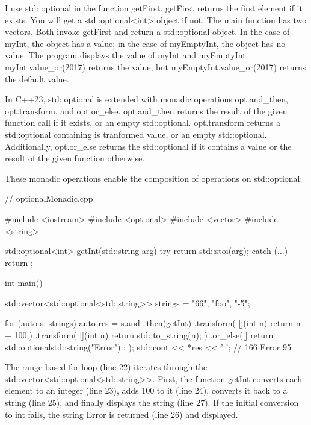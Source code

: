 I use std::optional in the function getFirst. getFirst returns the first element if it exists. You will get a std::optional<int> object if not. The main function has two vectors. Both invoke getFirst and return a std::optional object. In the case of myInt, the object has a value; in the case of myEmptyInt, the object has no value. The program displays the value of myInt and myEmptyInt. myInt.value\_or(2017) returns the value, but myEmptyInt.value\_or(2017) returns the default value.

In C++23, std::optional is extended with monadic operations opt.and\_then, opt.transform, and opt.or\_else. opt.and\_then returns the result of the given function call if it exists, or an empty std::optional. opt.transform returns a std::optional containing is tranformed value, or an empty std::optional. Additionally, opt.or\_else returns the std::optional if it contains a value or the result of the given function otherwise.

These monadic operations enable the composition of operations on std::optional:


\begin{cpp}
// optionalMonadic.cpp

#include <iostream>
#include <optional>
#include <vector>
#include <string>

std::optional<int> getInt(std::string arg) {
	try {
		return {std::stoi(arg)};
	}
	catch (...) {
		return { };
	}
}


int main() {

	std::vector<std::optional<std::string>> strings = {"66", "foo", "-5"};
	
	for (auto s: strings) {
		auto res = s.and_then(getInt)
					.transform( [](int n) { return n + 100;})
					.transform( [](int n) { return std::to_string(n); })
					.or_else([] { return std::optional{std::string("Error") }; });
		std::cout << *res << ' '; // 166 Error 95
	}

}
\end{cpp}

The range-based for-loop (line 22) iterates through the std::vector<std::optional<std::string>{}>. First, the function getInt converts each element to an integer (line 23), adds 100 to it (line 24), converts it back to a string (line 25), and finally displays the string (line 27). If the initial conversion to int fails, the string Error is returned (line 26) and displayed.


